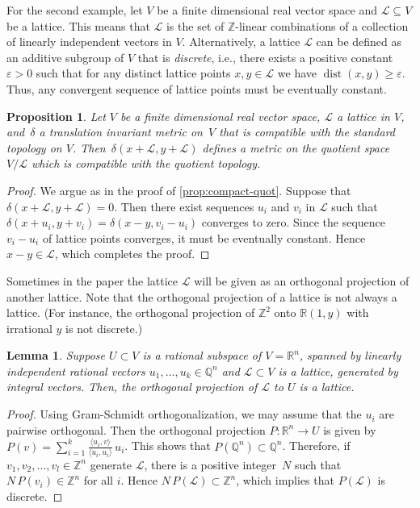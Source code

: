 \documentclass[10pt,a4paper]{article}
\newtheorem{lemma}[theorem]{Lemma}
\newtheorem{proposition}[theorem]{Proposition}
\theoremstyle{definition}
\DeclareMathOperator{\dist}{dist}
\newcommand{\QQ}{\mathbb{Q}}
\newcommand{\ZZ}{\mathbb{Z}}
\newcommand{\RR}{\mathbb{R}}
\numberwithin{equation}{section}
\begin{document}
For the second example, let $V$ be a finite dimensional real vector space
and $\mathcal{L}\subseteq V$ be a lattice. This means that
$\mathcal{L}$ is the set of $\ZZ$-linear combinations of a collection of
linearly independent vectors in $V$.
Alternatively, a lattice $\mathcal{L}$ can be defined as an additive subgroup of $V$
that is \textit{discrete},
i.e., there exists a positive constant $\varepsilon>0$ such that
for any distinct lattice points $x,y\in\mathcal{L}$ we have
$\dist(x,y)\geq\varepsilon$.
Thus, any convergent sequence of lattice points must be eventually constant.

\begin{proposition}
\label{prop:lattice-quot}
Let $V$ be a finite dimensional real vector space,
$\mathcal{L}$ a lattice in $V$,
and~$\delta$ a translation invariant metric on~$V$ that is compatible with the standard topology on $V$.
Then~$\delta(x+\mathcal{L}, y+\mathcal{L})$ defines a metric on the quotient space
$V/\mathcal{L}$ which is compatible with the quotient topology.
\end{proposition}

\begin{proof}
We argue as in the proof of \cref{prop:compact-quot}.
Suppose that $\delta(x+\mathcal{L},y+\mathcal{L})=0$.
Then there exist sequences $u_i$ and $v_i$ in $\mathcal{L}$ such that
$\delta(x+u_i,y+v_i)= \delta(x-y,v_i-u_i)$ converges to zero.
Since the sequence $v_i-u_i$ of lattice points converges,
it must be eventually constant. Hence $x-y\in\mathcal{L}$,
which completes the proof.
\end{proof}

Sometimes in the paper the lattice $\mathcal{L}$ will be given
as an orthogonal projection of another lattice.
Note that the orthogonal projection of a lattice is not always a lattice.
(For instance, the orthogonal projection of $\ZZ^2$ onto
$\RR(1,y)$ with irrational $y$ is not discrete.)

\begin{lemma}\label{lem:ort-proj-lattice}
Suppose $U\subset V$ is a rational subspace of $V=\RR^n$,
spanned by linearly independent rational vectors
$u_1,\dots,u_k\in\QQ^n$ and $\mathcal{L}\subset V$ is a lattice, generated by integral vectors.
Then, the orthogonal projection of $\mathcal{L}$ to $U$ is a lattice. %
\end{lemma}

\begin{proof}
Using Gram-Schmidt orthogonalization,
we may assume that the $u_i$ are pairwise orthogonal.
Then the orthogonal projection
$P:\RR^n\rightarrow U$ is given by
$P(v) = \sum_{i=1}^k \frac{\langle u_i, v\rangle}{\langle u_i,u_i \rangle} \, u_i$.
This shows that $P(\QQ^n)\subset\QQ^n$.
Therefore, if $v_1,v_2,\dots,v_l\in\ZZ^n$ generate $\mathcal{L}$,
there is a positive integer~$N$ such that $N\, P(v_i)\in\ZZ^n$ for all $i$.
Hence  $N\,P(\mathcal{L})\subset\ZZ^n$, which
implies that $P(\mathcal{L})$ is discrete. %
\end{proof}
\end{document}
